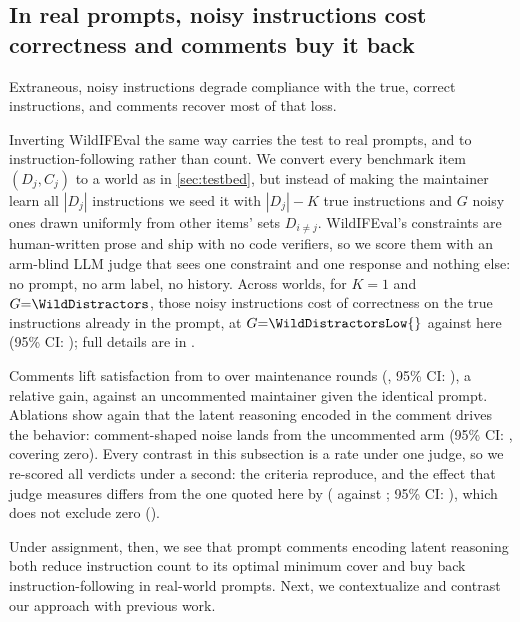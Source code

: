 \subsection{In real prompts, noisy instructions cost correctness and comments buy it back}
\label{sec:wild}

Extraneous, noisy instructions degrade compliance with the true, correct instructions, and comments
recover most of that loss.

Inverting WildIFEval \citep{lior2025wildifeval} the same way carries the test to real prompts, and to
instruction-following rather than count. We convert every benchmark item $(D_j, C_j)$ to a world as in
\autoref{sec:testbed}, but instead of making the maintainer learn all $|D_j|$ instructions we seed it with
$|D_j|-K$ true instructions and $G$ noisy ones drawn uniformly from other items' sets $D_{i \neq j}$.
WildIFEval's constraints are human-written prose and ship with no code verifiers, so we score them with an arm-blind
LLM judge that sees one constraint and one response and nothing else: no prompt, no arm label, no history.
Across \WildWorlds{} worlds, for $K{=}1$ and $G{=}\WildDistractors$, those noisy instructions cost
\WildInterferencePp{} of correctness on the true instructions already in the prompt, \WildCleanSatPct{} at
$G{=}\WildDistractorsLow{}$ against \WildNoisySatPct{} here (95\% CI: \WildInterferenceCI{}); full
details are in .

Comments lift satisfaction from \WildControlSatPct{} to \WildCommentSatPct{} over \WildT{} maintenance
rounds (\WildDeltaSatPp{}, 95\% CI: \WildDeltaSatCI{}), a \WildDeltaSatPct{} relative gain, against an
uncommented maintainer given the identical prompt. Ablations
show again that the latent reasoning encoded in the comment drives the behavior: comment-shaped noise lands
\WildPlaceboDeltaSatPp{} from the uncommented arm (95\% CI: \WildPlaceboDeltaSatCI{}, covering zero).
Every contrast in this subsection is a rate under one judge, so we re-scored all \JudgeVerdicts{} verdicts
under a second: the criteria reproduce, and the effect that judge measures differs from the one quoted here
by \JudgeDidPp{} (\JudgeAltDeltaSatPp{} against \WildDeltaSatPp{}; 95\% CI: \JudgeDidCI{}), which does
not exclude zero
().

Under assignment, then, we see that prompt comments encoding latent reasoning both reduce instruction count
to its optimal minimum cover and buy back instruction-following in real-world prompts. Next, we contextualize
and contrast our approach with previous work.
